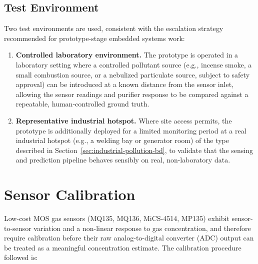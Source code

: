 
\subsection{Test Environment}
\label{sec:exp-environment}

Two test environments are used, consistent with the escalation strategy recommended for prototype-stage embedded systems work:

\begin{enumerate}
    \item \textbf{Controlled laboratory environment.} The prototype is operated in a laboratory setting where a controlled pollutant source (e.g., incense smoke, a small combustion source, or a nebulized particulate source, subject to safety approval) can be introduced at a known distance from the sensor inlet, allowing the sensor readings and purifier response to be compared against a repeatable, human-controlled ground truth.
    \item \textbf{Representative industrial hotspot.} Where site access permits, the prototype is additionally deployed for a limited monitoring period at a real industrial hotspot (e.g., a welding bay or generator room) of the type described in Section~\ref{sec:industrial-pollution-bd}, to validate that the sensing and prediction pipeline behaves sensibly on real, non-laboratory data. 
\end{enumerate}

\section{Sensor Calibration}
\label{sec:exp-calibration}

Low-cost MOS gas sensors (MQ135, MQ136, MiCS-4514, MP135) exhibit sensor-to-sensor variation and a non-linear response to gas concentration, and therefore require calibration before their raw analog-to-digital converter (ADC) output can be treated as a meaningful concentration estimate. The calibration procedure followed is:

